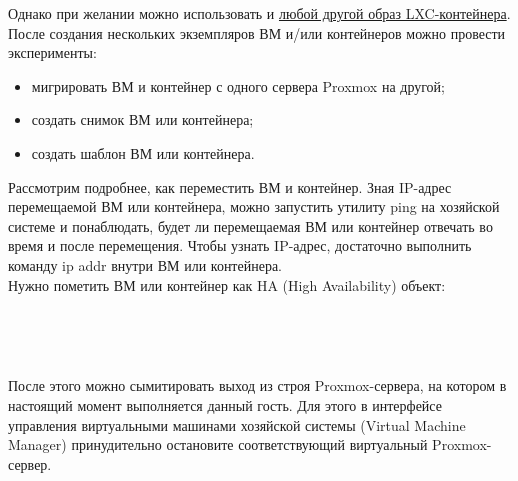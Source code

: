 \documentclass[14pt, a4paper]{article}
\begin{document}
Однако при желании можно использовать и \href{https://uk.lxd.images.canonical.com/images/}{любой другой образ LXC-контейнера}.\\

После создания нескольких экземпляров ВМ и/или контейнеров можно провести эксперименты:

\begin{itemize}
    \item мигрировать ВМ и контейнер с одного сервера Proxmox на другой;
    \item создать снимок ВМ или контейнера;
    \item создать шаблон ВМ или контейнера.
\end{itemize}

Рассмотрим подробнее, как переместить ВМ и контейнер. Зная IP-адрес перемещаемой ВМ или
контейнера, можно запустить утилиту ping на хозяйской системе и понаблюдать, будет ли
перемещаемая ВМ или контейнер отвечать во время и после перемещения. Чтобы узнать IP-адрес,
достаточно выполнить команду \colorbox{backcolour}{ip addr} внутри ВМ или контейнера.\\

Нужно пометить ВМ или контейнер как HA (High Availability) объект:

\begin{figure}[h]
    \centering
    \\  
    \label{framework} 
\end{figure}

\begin{figure}[h]
    \centering
    \\  
    \label{framework} 
\end{figure}

После этого можно сымитировать выход из строя Proxmox-сервера, на котором в настоящий момент
выполняется данный гость. Для этого в интерфейсе управления виртуальными машинами хозяйской
системы (Virtual Machine Manager) принудительно остановите соответствующий виртуальный
Proxmox-сервер.

\end{document}
